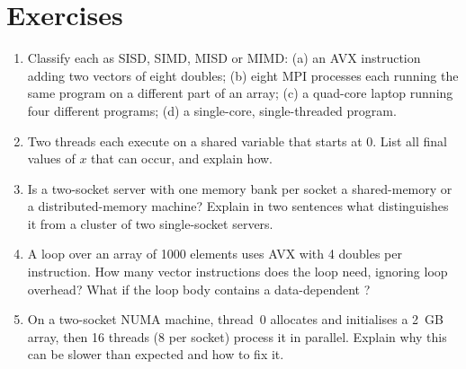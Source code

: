 \section*{Exercises}
\begin{enumerate}[label=\textbf{\thechapter.\arabic*},leftmargin=*]
  \item Classify each as SISD, SIMD, MISD or MIMD: (a) an AVX instruction adding two vectors of eight doubles;
        (b) eight MPI processes each running the same program on a different part of an array; (c) a quad-core
        laptop running four different programs; (d) a single-core, single-threaded program.
  \item Two threads each execute  on a shared variable that starts at $0$. List all final values of
        $x$ that can occur, and explain how.
  \item Is a two-socket server with one memory bank per socket a shared-memory or a distributed-memory machine? Explain
        in two sentences what distinguishes it from a cluster of two single-socket servers.
  \item A  loop over an array of 1000 elements uses AVX with 4 doubles per instruction. How many vector
        instructions does the loop need, ignoring loop overhead? What if the loop body contains a data-dependent
        ?
  \item On a two-socket NUMA machine, thread~0 allocates and initialises a 2~GB array, then 16 threads
        (8 per socket) process it in parallel. Explain why this can be slower than expected and how to fix it.
\end{enumerate}